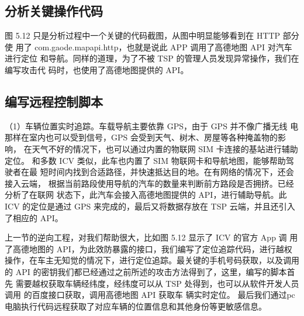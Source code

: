 \subsection[]{分析关键操作代码}
图 5.12 只是分析过程中一个关键的代码截图，从图中明显能够看到在 HTTP 部分使
用了 com.gaode.mapapi.http，也就是说此 APP 调用了高德地图 API 对汽车进行定位
和导航。同样的道理，为了不被 TSP 的管理人员发现异常操作，我们在编写攻击代
码时，也使用了高德地图提供的 API。

\subsection[]{编写远程控制脚本}
（1）车辆位置实时追踪。车载导航主要依靠 GPS，由于 GPS 并不像广播无线
电那样在室内也可以受到信号，GPS 会受到天气、树木、房屋等各种掩盖物的影响，
在天气不好的情况下，也可以通过内置的物联网 SIM 卡连接的基站进行辅助定位。
和多数 ICV 类似，此车也内置了 SIM 物联网卡和导航地图，能够帮助驾驶者在最
短时间内找到合适路径，并快速抵达目的地。在有网络的情况下，还会接入云端，
根据当前路段使用导航的汽车的数量来判断前方路段是否拥挤。已经分析了在联网
状态下，此汽车会接入高德地图提供的 API，进行辅助导航。此 ICV 的定位是通过
GPS 来完成的，最后又将数据存放在 TSP 云端，并且还引入了相应的 API。

上一节的逆向工程，对我们帮助很大，比如图 5.12 显示了 ICV 的官方 App 调
用了高德地图的 API，为此效防暴露的接口，我们编写了定位追踪代码，进行越权
操作，在车主无知觉的情况下，进行定位追踪。最关键的手机号码获取，以及调用
的 API 的密钥我们都已经通过之前所述的攻击方法得到了，这里，编写的脚本首先
需要越权获取车辆经纬度，经纬度可以从 TSP 处得到，也可以从软件开发人员调用
的百度接口获取，调用高德地图 API 获取车
辆实时定位。
最后我们通过pc电脑执行代码远程获取了对应车辆的位置信息和其他身份等更敏感信息。

